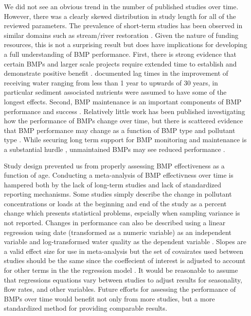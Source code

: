 \documentclass[utf8]{FrontiersinHarvard}
\begin{document}
We did not see an obvious trend in the number of published studies over time.
However, there was a clearly skewed distribution in study length for all of the reviewed parameters.
The prevalence of short-term studies has been observed in similar domains such as stream/river restoration \citep{bernhardtSynthesizingRiverRestoration2005}.
Given the nature of funding resources, this is not a surprising result but does have implications for developing a full understanding of BMP performance.
First, there is strong evidence that certain BMPs and larger scale projects require extended time to establish and demonstrate positive benefit \citep{mealsLagTimeWater2010, grudzinskiDoesRiparianFencing2020}.
\citet{mealsLagTimeWater2010} documented lag times in the improvement of receiving water ranging from less than 1 year to upwards of 30 years, in particular sediment associated nutrients were assumed to have some of the longest effects.
Second, BMP maintenance is an important components of BMP performance and success \citep{kochNitrogenRemovalStormwater2014, heidariGreenStormwaterInfrastructure2023}.
Relatively little work has been published investigating how the performance of BMPs change over time, but there is scattered evidence that BMP performance may change as a function of BMP type and pollutant type \citep{liuReviewEffectivenessBest2017}.
While securing long term support for BMP monitoring and maintenance is a substantial hurdle \citep{heidariGreenStormwaterInfrastructure2023}, unmaintained BMPs may see reduced performance \citep{kochNitrogenRemovalStormwater2014, liuReviewEffectivenessBest2017}.

Study design prevented us from properly assessing BMP effectiveness as a function of age.
Conducting a meta-analysis of BMP effectivness over time is hampered both by the lack of long-term studies and lack of standardized reporting mechanisms.
Some studies simply describe the change in pollutant concentrations or loads at the beginning and end of the study as a percent change \citep{haileHydraulicPerformancePollutant2016} which presents statistical problems, espcially when sampling variance is not reported.
Changes in performance can also be described using a linear regression using date (transformed as a numeric variable) as an independent variable and log-transformed water quality as the dependent variable \citep{mitschCreatingWetlandsPrimary2012, mitschValidationEcosystemServices2014, pausAssessmentHydraulicToxic2014}.
Slopes are a valid effect size for use in meta-analysis but the set of covairates used between studies should be the same since the coeffecient of interest is adjusted to account for other terms in the the regression model \citep{beckerSynthesisRegressionSlopes2007}.
It would be reasonable to assume that regressions equations vary between studies to adjust results for seasonality, flow rates, and other variables.
Future efforts for assessing the performance of BMPs over time would benefit not only from more studies, but a more standardized method for providing comparable results.
\end{document}
